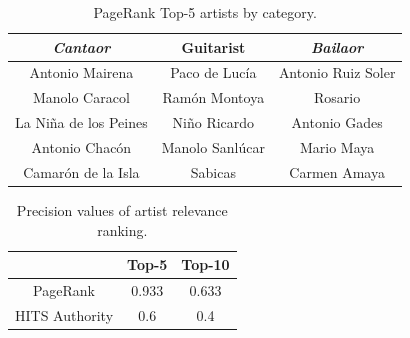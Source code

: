 \begin{table}[]
    \centering
    \begin{tabular}{c c c }
    \hline
    \textit{Cantaor} & Guitarist & \textit{Bailaor} \\
    \hline
Antonio Mairena & Paco de Luc\'{i}a & Antonio Ruiz Soler \\
Manolo Caracol & Ram\'{o}n Montoya & Rosario \\
La Ni\~{n}a de los Peines & Ni\~{n}o Ricardo & Antonio Gades \\
Antonio Chac\'{o}n & Manolo Sanl\'{u}car & Mario Maya \\
Camar\'{o}n de la Isla & Sabicas & Carmen Amaya \\
    \hline
    \end{tabular}
    \caption{PageRank Top-5 artists by category.}    
    \label{tbl:musicology:pagerank}
\end{table}



\begin{table}[]
    \centering
    \begin{tabular}{ c c c }
    \hline
    & Top-5 & Top-10 \\
    \hline
    PageRank & 0.933 & 0.633 \\
    HITS Authority & 0.6 & 0.4 \\
    \hline
    \end{tabular}
    \caption{Precision values of artist relevance ranking.}    
    \label{tbl:musicology:experts_results}
\end{table}

